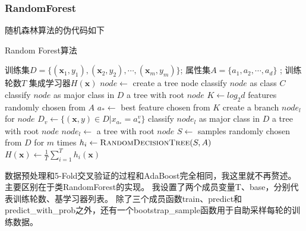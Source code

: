 \documentclass{article}
\begin{document}
    \subsubsection{RandomForest}
        随机森林算法的伪代码如下
        
        \begin{algorithm}  
            \caption{Random Forest算法}  
            \begin{algorithmic}[1] 
                \Require 训练集$D = \{ (\boldsymbol{x}_1, y_1), (\boldsymbol{x}_2, y_2), \cdots, (\boldsymbol{x}_m, y_m) \}$;
                        属性集$A = \{ a_1, a_2, \cdots, a_d \}$ ;
                        训练轮数$T$
                \Ensure 集成学习器$H(\boldsymbol{x})$
                    \State $node \gets $ create a tree node
                    \State classify $node$ as class $C$
                    \EndIf
                    \State classify $node$ as major class in $D$
                    \State \Return a tree with root $node$
                    \EndIf
                    \State $K \gets log_2 d$ features randomly chosen from $A$
                    \State $a_* \gets$ best feature chosen from $K$
                    \State create a branch $node_l$ for $node$
                    \State $D_v \gets \{ (\boldsymbol{x}, y) \in D | x_{a_*}= a_*^v\}$
                    \State classify $node_l$ as major class in $D$
                    \State \Return a tree with root $node$
                    \Else
                    \State $node_l \gets $ 
                    \EndIf
                    \EndFor
                    \State \Return a tree with root $node$
                \EndFunction  
                \State  
                        \State $S \gets$ samples randomly chosen from $D$ for $m$ times
                        \State $h_i \gets \Call {RandomDecisionTree}{S, A}$
                    \EndFor
                    \State \Return $H(\boldsymbol{x}) \gets \frac{1}{T} \sum_{i=1}^T h_i(\boldsymbol{x})$
                \EndFunction  
            \end{algorithmic}  
        \end{algorithm}
        数据预处理和5-Fold交叉验证的过程和AdaBoost完全相同，我这里就不再赘述。主要区别在于类RandomForest的实现。
        我设置了两个成员变量T、base，分别代表训练轮数、基学习器列表。
        除了三个成员函数train、predict和predict\_with\_prob之外，还有一个bootstrap\_sample函数用于自助采样每轮的训练数据。
\end{document}
